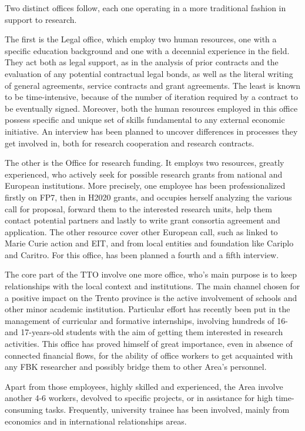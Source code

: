 Two distinct offices follow, each one operating in a more traditional fashion in support to research.

The first is the Legal office, which employ two human resources, one with a specific education background and one with a decennial experience in the field. They act both as legal support, as in the analysis of prior contracts and the evaluation of any potential contractual legal bonds, as well as the literal writing of general agreements, service contracts and grant agreements. The least is known to be time-intensive, because of the number of iteration required by a contract to be eventually signed. Moreover, both the human resources employed in this office possess specific and unique set of skills fundamental to any external economic initiative. An interview has been planned to uncover differences in processes they get involved in, both for research cooperation and research contracts.

The other is the Office for research funding. It employs two resources, greatly experienced, who actively seek for possible research grants from national and European institutions. More precisely, one employee has been professionalized firstly on FP7, then in H2020 grants, and occupies herself analyzing the various call for proposal, forward them to the interested research units, help them contact potential partners and lastly to write grant consortia agreement and application. The other resource cover other European call, such as linked to Marie Curie action and EIT, and from local entities and foundation like Cariplo and Caritro. For this office, has been planned a fourth and a fifth interview.

The core part of the TTO involve one more office, who’s main purpose is to keep relationships with the local context and institutions. The main channel chosen for a positive impact on the Trento province is the active involvement of schools and other minor academic institution. Particular effort has recently been put in the management of curricular and formative internships, involving hundreds of 16- and 17-years-old students with the aim of getting them interested in research activities. This office has proved himself of great importance, even in absence of connected financial flows, for the ability of office workers to get acquainted with any FBK researcher and possibly bridge them to other Area’s personnel. 

Apart from those employees, highly skilled and experienced, the Area involve another 4-6 workers, devolved to specific projects, or in assistance for high time-consuming tasks. Frequently, university trainee has been involved, mainly from economics and in international relationships areas.

